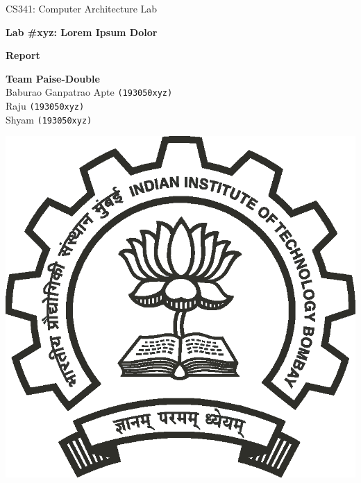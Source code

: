 \documentclass[11pt,swedish, openany]{book}
\begin{document}

\begin{titlepage}
	\clearpage\thispagestyle{empty}
	\centering
	\vspace{2cm}

	{\large CS341: Computer Architecture Lab\par}
	\vspace{4cm}
	{\Huge \textbf{Lab \#xyz: Lorem Ipsum Dolor}} \\
	\vspace{0.2cm}
	{\huge \textbf{Report} \par}
	\vspace{4cm}
	{\normalsize {\large \textbf{Team Paise-Double}}\\ 
	              Baburao Ganpatrao Apte \texttt{(193050xyz)} \\
	             Raju \texttt{(193050xyz)} \\
	             Shyam \texttt{(193050xyz)} 
	             \par}
	\vspace{2cm}
	\vfill

    \includegraphics[scale=0.30]{iitb_logo/iitb_logo.eps}
    

\end{titlepage}
\end{document}
